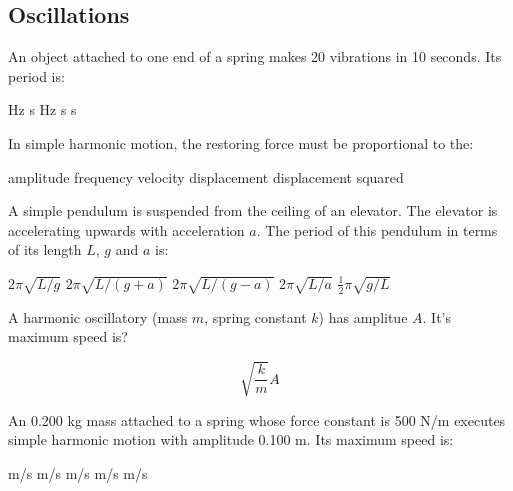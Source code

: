 \begin{questions}

\section{Oscillations}

\question[2] An object attached to one end of a spring makes 20
vibrations in 10 seconds. Its period is:
\begin{oneparchoices}
   Hz
   s
   Hz
   s
   s
\end{oneparchoices}

\question[2] In simple harmonic motion, the restoring force must be
proportional to the:
\begin{oneparchoices}
  \choice amplitude
  \choice frequency
  \choice velocity
  \CorrectChoice displacement
  \choice displacement squared
\end{oneparchoices}

\question[2] A simple pendulum is suspended from the ceiling of an
elevator. The elevator is accelerating upwards with acceleration
$a$. The period of this pendulum in terms of its length $L$, $g$ and
$a$ is:
\begin{oneparchoices}
  \choice $2\pi\sqrt{L/g}$
  \CorrectChoice $2\pi\sqrt{L/(g+a)}$
  \choice $2\pi\sqrt{L/(g - a)}$
  \choice $2\pi \sqrt{L/a}$
  \choice $\frac{1}{2}\pi \sqrt{g/L}$
\end{oneparchoices}

\question[2] A harmonic oscillatory (mass $m$, spring constant $k$)
has amplitue $A$. It's maximum speed is?
\begin{solution}
  $$\sqrt{\frac{k}{m}} A$$
\end{solution}

\question[2] An 0.200 kg mass attached to a spring whose force
constant is 500 N/m executes simple harmonic motion with amplitude
0.100 m. Its maximum speed is:
\begin{oneparchoices}
   m/s
   m/s
   m/s
   m/s
   m/s
\end{oneparchoices}


\end{questions}
